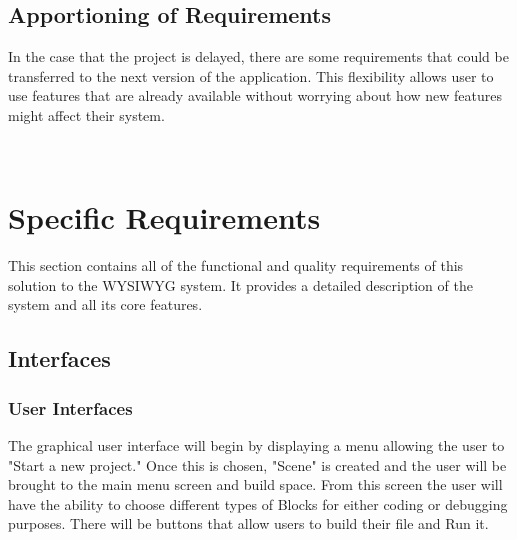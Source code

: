 \documentclass[journal,10pt,onecolumn,compsoc]{IEEEtran} \usepackage[margin=1.0in]{geometry} \usepackage{pdfpages} \usepackage{graphicx}
\begin{document}
\subsection{Apportioning of Requirements}

In the case that the project is delayed, there are some requirements that could be transferred to the next version of the application. 
This flexibility allows user to use features that are already available without worrying about how new features might affect their system.

\begin{minipage}{\textwidth}
		\\
	\end{minipage}


\newpage

\section{Specific Requirements}

This section contains all of the functional and quality requirements of this solution to the WYSIWYG system. 
It provides a detailed description of the system and all its core features.


\subsection{Interfaces}
\subsubsection{User Interfaces}

The graphical user interface will begin by displaying a menu allowing the user to "Start a new project."
Once this is chosen, "Scene" is created and the user will be brought to the main menu screen and build space.
From this screen the user will have the ability to choose different types of Blocks for either coding or debugging purposes.
There will be buttons that allow users to build their file and Run it.
\end{document}
